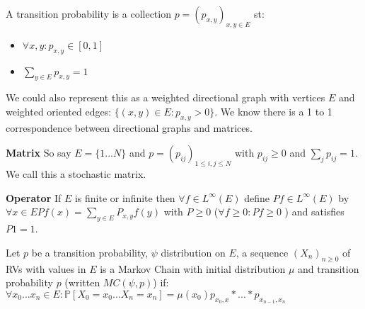 \begin{defn}
	A transition probability is a collection $p=(p_{x,y})_{x,y \in E}$ st:
	\begin{itemize}
		\item $\forall x,y: p_{x,y}\in [0,1]$ 
		\item $\sum_{y \in E} p_{x,y}=1$
	\end{itemize}
	
\end{defn}

We could also represent this as a weighted directional graph with vertices $E$ and weighted oriented edges: $\{(x,y) \in E: p_{x,y}>0\}$. We know there is a 1 to 1 correspondence between directional graphs and matrices.

\textbf{Matrix} So say $E=\{1...N\}$ and $p=(p_{ij})_{1\leq i,j\leq N}$ with $p_{ij}\geq 0$ and $\sum_{j}p_{ij}=1$. We call this a stochastic matrix.

\textbf{Operator} If $E$ is finite or infinite then $\forall f \in L^\infty (E)$ define $Pf \in L^\infty (E)$ by  $\forall x \in E Pf(x)=\sum_{y \in E}P_{x,y}f(y)$ with $P\geq 0 $ ($\forall  f \geq 0: Pf \geq 0$ ) and satisfies $P1=1$.

\begin{defn}
	Let $p$ be a transition probability, $\psi$ distribution on $E$, a sequence $(X_n)_{n\geq 0}$ of RVs with values in $E $ is a Markov Chain with initial distribution $\mu$ and transition probability $p$ (written $MC(\psi, p)$) if:
	$\forall  x_0...x_n \in E: \mathbb{P} \left[ X_0=x_0...X_n=x_n \right] = \mu(x_0)p_{x_0,x}*...*p_{x_{n-1},x_{n}}$

\end{defn}

